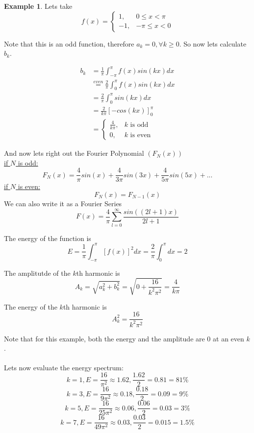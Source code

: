\documentclass[12pt]{article}
\theoremstyle{plain}
\theoremstyle{definition}
\newtheorem{example}[theorem]{Example}
\begin{document}
\begin{example}
    Lets take
    $$f(x) = \begin{cases}
    1, &0\leq x < \pi\\
    -1, &-\pi \leq x < 0
    \end{cases}$$

    Note that this is an odd function, therefore $a_k = 0, \forall k \geq 0$. So now lets calculate $b_k$.

    \begin{align*}
        b_k &= \frac{1}{\pi} \int^\pi_{-\pi} f(x)sin(kx) dx\\
        &\overset{even}{=} \frac{2}{\pi} \int^\pi_{0} f(x)sin(kx) dx\\
        &= \frac{2}{\pi} \int^\pi_{0} sin(kx) dx\\
        &= \frac{2}{k\pi} [ -cos(kx) ]^\pi_0\\
        &= \begin{cases}
            \frac{4}{k\pi}, &\text{$k$ is odd}\\
            0, &\text{$k$ is even}
        \end{cases}
    \end{align*}

    And now lets right out the Fourier Polynomial $(F_N (x))$\\
    \underline{if $N$ is odd:}
    $$F_N (x) = \frac{4}{\pi}sin(x) + \frac{4}{3\pi}sin(3x) + \frac{4}{5\pi}sin(5x) + ...$$
    \underline{if $N$ is even:}
    $$F_N (x) = F_{N-1} (x)$$
    We can also write it as a Fourier Series
    $$F(x) = \frac{4}{\pi} \sum^\infty_{l=0} \frac{sin((2l+1)x)}{2l+1}$$

    The energy of the function is
    $$E = \frac{1}{\pi} \int^\pi_{-\pi} [f(x)]^2 dx = \frac{2}{\pi} \int^\pi_0 dx = 2$$

    The amplitutde of the $k$th harmonic is
    $$A_k = \sqrt{a_k^2 + b_k^2} = \sqrt{0 + \frac{16}{k^2\pi^2}} = \frac{4}{k\pi}$$

    The energy of the $k$th harmonic is
    $$A_k^2 = \frac{16}{k^2 \pi^2}$$

    Note that for this example, both the energy and the amplitude are 0 at an even $k$.\\
    \\
    Lets now evaluate the energy spectrum:
    $$k=1, E= \frac{16}{\pi^2} \approx 1.62, \frac{1.62}{2}=0.81=81\%$$
    $$k=3, E= \frac{16}{9\pi^2} \approx 0.18, \frac{0.18}{2}=0.09=9\%$$
    $$k=5, E= \frac{16}{25\pi^2} \approx 0.06, \frac{0.06}{2}=0.03=3\%$$
    $$k=7, E= \frac{16}{49\pi^2} \approx 0.03, \frac{0.03}{2}=0.015=1.5\%$$

\end{example}
\end{document}
